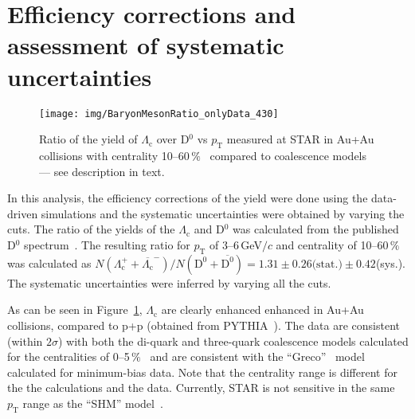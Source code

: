 \section{Efficiency corrections and assessment of systematic uncertainties}

\begin{figure}[htb]
\centering %
\texttt{[image: img/BaryonMesonRatio\_onlyData\_430]}
\caption{Ratio of the yield of $\Lambda_\mathrm{c}$ over D$^0$ vs $p_\mathrm{T}$ measured at STAR in Au+Au collisions with centrality 10--60$\,\%$~\cite{GuannanLc} compared to coalescence models~\cite{LcCoalescence_OhKoLeeYasui, Ghosh_Lc_rescattering, SHM} --- see description in text.}
\label{fig:ratio}
\end{figure}

In this analysis, the efficiency corrections of the yield were done using the data-driven simulations and the systematic uncertainties were obtained by varying the cuts. The ratio of the yields of the $\Lambda_\mathrm{c}$ and D$^0$ was calculated from the published D$^0$ spectrum~\cite{publishedDzero}. The resulting ratio for $p_\mathrm{T}$ of 3--6$\,$GeV$/c$ and centrality of 10--60$\,\%$ was calculated as $N(\Lambda_\mathrm{c}^+ + \overline{\Lambda_\mathrm{c}}^-)/N(\mathrm{D^0 + \overline{D^0}}) = 1.31 \pm 0.26\text{(stat.)} \pm 0.42$(sys.). The systematic uncertainties were inferred by varying all the cuts.


As can be seen in Figure~\ref{fig:ratio}, $\Lambda_\mathrm{c}$ are clearly enhanced enhanced in Au+Au collisions, compared to p+p (obtained from PYTHIA~\cite{PYTHIA}). The data are consistent (within $2\sigma$) with both the di-quark and three-quark coalescence models calculated for the centralities of 0--5$\,\%$~\cite{LcCoalescence_OhKoLeeYasui} and are consistent with the ``Greco''~\cite{Ghosh_Lc_rescattering} model calculated for minimum-bias data. Note that the centrality range is different for the the calculations and the data. Currently, STAR is not sensitive in the same $p_\mathrm{T}$ range as the ``SHM'' model~\cite{SHM}. 



% 



